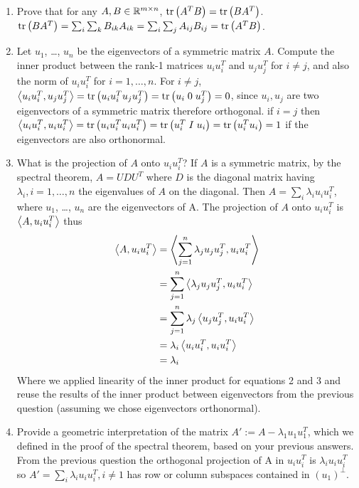 \documentclass[12pt,twoside]{article}
\begin{document}
\begin{enumerate}
\begin{enumerate}
\item Prove that for any $A,B \in \mathbb{R}^{m \times n}$, $\operatorname{tr}\left( A^TB \right)=\operatorname{tr}\left( BA^T \right)$.
$\operatorname{tr}\left( BA^T \right) =  \sum_i \sum_k B_{ik} A_{ik} =  \sum_i \sum_j A_{ij} B_{ij} =  \operatorname{tr}\left( A^TB \right)$.

\item Let $u_1$, \ldots, $u_n$ be the eigenvectors of a symmetric matrix $A$. Compute the inner product between the rank-1 matrices $u_iu_i^T$ and $u_ju_j^T$ for $i \neq j$, and also the norm of $u_iu_i^T$ for $i=1,\ldots,n$. 
For $i \neq j$, $\left \langle u_iu_i^T, u_ju_j^T\right \rangle = \operatorname{tr}\left( u_iu_i^Tu_ju_j^T \right) = \operatorname{tr}\left( u_i \; 0 \; u_j^T \right) = 0$, since $u_i, u_j$ are two eigenvectors of a symmetric matrix therefore orthogonal.
if $i=j$ then  $\left \langle u_iu_i^T, u_iu_i^T\right \rangle = \operatorname{tr}\left( u_iu_i^Tu_iu_i^T \right) =  \operatorname{tr}\left( u_i^T \; I \; u_i \right) = \operatorname{tr}\left( u_i^Tu_i \right) = 1$ if the eigenvectors are also orthonormal.
\item What is the projection of $A$ onto $u_iu_i^T$?
If $A$ is a symmetric matrix, by the spectral theorem, $A=U D U^T$ where $D$ is the diagonal matrix having $\lambda_i, i=1, \ldots,n$ the eigenvalues of $A$ on the diagonal.  Then $A = \sum_i \lambda_i u_i u_i^T$,  where $u_1$, \ldots, $u_n$ are the eigenvectors of A. The projection of $A$ onto $u_iu_i^T$ is $\left \langle A, u_iu_i^T\right \rangle$ thus
\begin{align*}
	\left \langle A, u_iu_i^T\right \rangle	&= 	\left \langle \sum_{j=1}^n  \lambda_j u_j u_j^T, u_i u_i^T\right \rangle \\
					&=	\sum_{j=1}^n\left \langle \lambda_j u_j u_j^T, u_i u_i^T\right \rangle \\
					&= 	\sum_{j=1}^n \lambda_j \left \langle u_j u_j^T, u_i u_i^T\right \rangle \\
					&=	 \lambda_i \left \langle u_i u_i^T, u_i u_i^T\right \rangle \\
					&= 	 \lambda_i 
\end{align*}
Where we applied linearity of the inner product for equations 2 and 3 and reuse the results of the inner product between eigenvectors from the previous question (assuming we chose eigenvectors orthonormal).

\item Provide a geometric interpretation of the matrix $A':=A-\lambda_1 u_1u_1^T$, which we defined in the proof of the spectral theorem, based on your previous answers.
From the previous question the orthogonal projection of A in $u_iu_i^T$ is $\lambda_i u_iu_i^T$ so $A' = \sum_i \lambda_i u_iu_i^T, i \neq 1$ has row or column subspaces contained in  $(u_1)^\bot$.

\end{enumerate}
\newpage


\end{enumerate}
\end{document}
